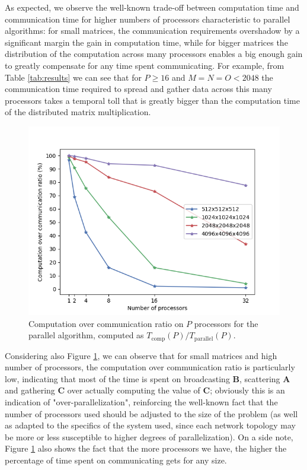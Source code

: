 As expected, we observe the well-known trade-off between computation time and communication time for higher numbers of processors characteristic to parallel algorithms: for small matrices, the communication requirements overshadow by a significant margin the gain in computation time, while for bigger matrices the distribution of the computation across many processors enables a big enough gain to greatly compensate for any time spent communicating. 
For example, from Table \ref{tab:results} we can see that for $P \ge 16$ and $M=N=O < 2048$ the communication time required to spread and gather data across this many processors takes a temporal toll that is greatly bigger than the computation time of the distributed matrix multiplication.

\begin{figure}[hb!]
    \centering
    \includegraphics[width=0.8\linewidth]{figures/comp_over_comm.png}
    \caption{Computation over communication ratio on $P$ processors for the parallel algorithm, computed as $T_{\text{comp}}(P)/T_{\text{parallel}}(P).$}
    \label{fig:compcomm}
\end{figure}

Considering also Figure \ref{fig:compcomm}, we can observe that for small matrices and high number of processors, the computation over communication ratio is particularly low, indicating that most of the time is spent on broadcasting $\textbf{B}$, scattering $\textbf{A}$ and gathering $\textbf{C}$ over actually computing the value of $\textbf{C}$; obviously this is an indication of "over-parallelization", reinforcing the well-known fact that the number of processors used should be adjusted to the size of the problem (as well as adapted to the specifics of the system used, since each network topology may be more or less susceptible to higher degrees of parallelization).
On a side note, Figure \ref{fig:compcomm} also shows the fact that the more processors we have, the higher the percentage of time spent on communicating gets for any size.

